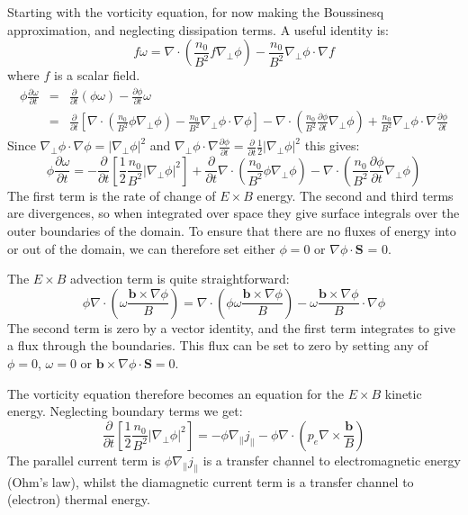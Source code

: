 \documentclass[12pt,a4paper]{article}
\begin{document}
Starting with the vorticity equation, for now making the Boussinesq approximation, and neglecting dissipation terms.
A useful identity is:
\[
f\omega = \nabla\cdot\left(\frac{n_0}{B^2}f\nabla_\perp\phi\right) - \frac{n_0}{B^2}\nabla_\perp\phi\cdot\nabla f
\]
where $f$ is a scalar field.
\begin{eqnarray*}
\phi\frac{\partial\omega}{\partial t} &=& \frac{\partial}{\partial t}\left(\phi\omega\right) - \frac{\partial \phi}{\partial t}\omega \\
&=& \frac{\partial}{\partial t}\left[ \nabla\cdot\left(\frac{n_0}{B^2}\phi\nabla_\perp\phi\right) - \frac{n_0}{B^2}\nabla_\perp \phi\cdot\nabla \phi\right] - \nabla\cdot\left(\frac{n_0}{B^2}\frac{\partial \phi}{\partial t}\nabla_\perp\phi\right) + \frac{n_0}{B^2}\nabla_\perp \phi\cdot\nabla \frac{\partial \phi}{\partial t}
\end{eqnarray*}
Since $\nabla_\perp\phi\cdot\nabla\phi = \left|\nabla_\perp\phi\right|^2$ and $\nabla_\perp \phi\cdot\nabla \frac{\partial \phi}{\partial t} = \frac{\partial}{\partial t}\frac{1}{2}\left|\nabla_\perp\phi\right|^2$ this gives:
\[
\phi\frac{\partial\omega}{\partial t} = -\frac{\partial}{\partial t}\left[\frac{1}{2}\frac{n_0}{B^2}\left|\nabla_\perp\phi\right|^2\right] + \frac{\partial}{\partial t}\nabla\cdot\left(\frac{n_0}{B^2}\phi\nabla_\perp\phi\right) - \nabla\cdot\left(\frac{n_0}{B^2}\frac{\partial\phi}{\partial t}\nabla_\perp\phi\right)
\]
The first term is the rate of change of $E\times B$ energy. The second and third terms are divergences, so when integrated over space they give surface integrals over the outer boundaries of the domain. To ensure that there are no fluxes of energy into or out of the domain, we can therefore set either $\phi = 0$ or $\nabla\phi\cdot \mathbf{S}$ = 0.

The $E\times B$ advection term is quite straightforward:
\[
\phi\nabla\cdot\left(\omega \frac{\mathbf{b}\times\nabla\phi}{B}\right) = \nabla\cdot\left(\phi\omega \frac{\mathbf{b}\times\nabla\phi}{B}\right) - \omega \frac{\mathbf{b}\times\nabla\phi}{B}\cdot\nabla\phi
\]
The second term is zero by a vector identity, and the first term integrates to give a flux through the boundaries. This flux can be set to zero by setting any of $\phi=0$, $\omega = 0$ or $\mathbf{b}\times\nabla\phi\cdot\mathbf{S} = 0$.

The vorticity equation therefore becomes an equation for the $E\times B$ kinetic energy. Neglecting boundary terms we get:
\begin{equation}
\frac{\partial}{\partial t}\left[\frac{1}{2}\frac{n_0}{B^2}\left|\nabla_\perp\phi\right|^2\right] = -\phi\nabla_{||}j_{||} - \phi\nabla\cdot\left(p_e\nabla\times\frac{\mathbf{b}}{B}\right)
\end{equation}
The parallel current term is $\phi\nabla_{||}j_{||}$ is a transfer channel to electromagnetic energy (Ohm's law),
whilst the diamagnetic current term is a transfer channel to (electron) thermal energy.
\end{document}
